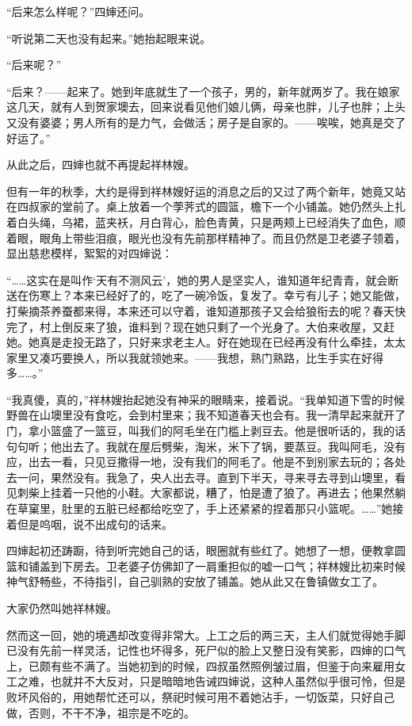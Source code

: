 \par “后来怎么样呢？”四婶还问。
\par “听说第二天也没有起来。”她抬起眼来说。
\par “后来呢？”
\par “后来？——起来了。她到年底就生了一个孩子，男的，新年就两岁了。我在娘家这几天，就有人到贺家墺去，回来说看见他们娘儿俩，母亲也胖，儿子也胖；上头又没有婆婆；男人所有的是力气，会做活；房子是自家的。——唉唉，她真是交了好运了。”
\par 从此之后，四婶也就不再提起祥林嫂。
\par 但有一年的秋季，大约是得到祥林嫂好运的消息之后的又过了两个新年，她竟又站在四叔家的堂前了。桌上放着一个荸荠式的圆篮，檐下一个小铺盖。她仍然头上扎着白头绳，乌裙，蓝夹袄，月白背心，脸色青黄，只是两颊上已经消失了血色，顺着眼，眼角上带些泪痕，眼光也没有先前那样精神了。而且仍然是卫老婆子领着，显出慈悲模样，絮絮的对四婶说：
\par “……这实在是叫作‘天有不测风云’，她的男人是坚实人，谁知道年纪青青，就会断送在伤寒上？本来已经好了的，吃了一碗冷饭，复发了。幸亏有儿子；她又能做，打柴摘茶养蚕都来得，本来还可以守着，谁知道那孩子又会给狼衔去的呢？春天快完了，村上倒反来了狼，谁料到？现在她只剩了一个光身了。大伯来收屋，又赶她。她真是走投无路了，只好来求老主人。好在她现在已经再没有什么牵挂，太太家里又凑巧要换人，所以我就领她来。——我想，熟门熟路，比生手实在好得多……。”
\par “我真傻，真的，”祥林嫂抬起她没有神采的眼睛来，接着说。“我单知道下雪的时候野兽在山墺里没有食吃，会到村里来；我不知道春天也会有。我一清早起来就开了门，拿小篮盛了一篮豆，叫我们的阿毛坐在门槛上剥豆去。他是很听话的，我的话句句听；他出去了。我就在屋后劈柴，淘米，米下了锅，要蒸豆。我叫阿毛，没有应，出去一看，只见豆撒得一地，没有我们的阿毛了。他是不到别家去玩的；各处去一问，果然没有。我急了，央人出去寻。直到下半天，寻来寻去寻到山墺里，看见刺柴上挂着一只他的小鞋。大家都说，糟了，怕是遭了狼了。再进去；他果然躺在草窠里，肚里的五脏已经都给吃空了，手上还紧紧的捏着那只小篮呢。……”她接着但是呜咽，说不出成句的话来。
\par 四婶起初还踌蹰，待到听完她自己的话，眼圈就有些红了。她想了一想，便教拿圆篮和铺盖到下房去。卫老婆子仿佛卸了一肩重担似的嘘一口气；祥林嫂比初来时候神气舒畅些，不待指引，自己驯熟的安放了铺盖。她从此又在鲁镇做女工了。
\par 大家仍然叫她祥林嫂。
\par 然而这一回，她的境遇却改变得非常大。上工之后的两三天，主人们就觉得她手脚已没有先前一样灵活，记性也坏得多，死尸似的脸上又整日没有笑影，四婶的口气上，已颇有些不满了。当她初到的时候，四叔虽然照例皱过眉，但鉴于向来雇用女工之难，也就并不大反对，只是暗暗地告诫四婶说，这种人虽然似乎很可怜，但是败坏风俗的，用她帮忙还可以，祭祀时候可用不着她沾手，一切饭菜，只好自己做，否则，不干不净，祖宗是不吃的。
